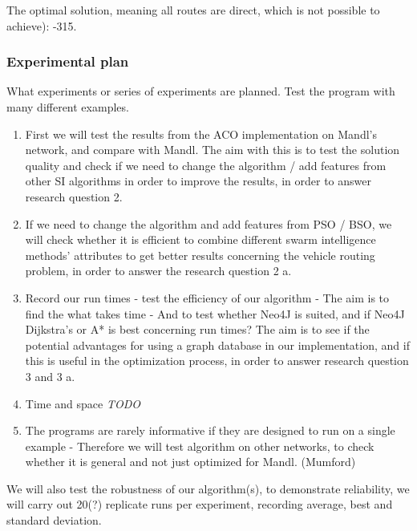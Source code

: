 The optimal solution, meaning all routes are direct, which is not possible to achieve): -315.
  
\subsubsection{Experimental plan}
What experiments or series of experiments are planned. Test the program with many different examples. 

\begin{enumerate}
\item First we will test the results from the ACO implementation on Mandl's network, and compare with Mandl. 
The aim with this is to test the solution quality and check if we need to change the algorithm / add features from other SI algorithms in order to improve the results, in order to answer research question 2.

\item If we need to change the algorithm and add features from PSO / BSO, we will check whether it is efficient to combine different swarm intelligence methods' attributes to get better results concerning the vehicle routing problem, in order to answer the research question 2 a.

\item Record our run times - test the efficiency of our algorithm - The aim is to find the what takes time - And to test whether Neo4J is suited, and if Neo4J Dijkstra's or A* is best concerning run times? The aim is to see if the potential advantages for using a graph database in our implementation, and if this is useful in the optimization process, in order to answer research question 3 and 3 a.

\item Time and space  \emph{\color{red} TODO}

\item The programs are rarely informative if they are designed to run on a single example - Therefore we will test algorithm on other networks, to check whether it is general and not just optimized for Mandl. (Mumford)

\end{enumerate}

We will also test the robustness of our algorithm(s), to demonstrate reliability, we will carry out 20(?) replicate runs per experiment, recording average, best and standard deviation. 


